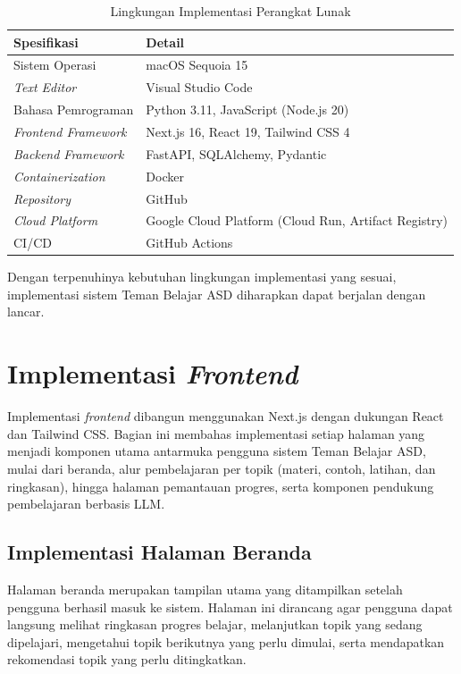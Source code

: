 \begin{table}[H]
    \centering
    \caption{Lingkungan Implementasi Perangkat Lunak}
    \label{tab:impl-software}
    \begin{tabular}{|L{4.5cm}|L{8cm}|}
    \hline
    \textbf{Spesifikasi} & \textbf{Detail} \\
    \hline
    Sistem Operasi & macOS Sequoia 15 \\
    \hline
    \textit{Text Editor} & Visual Studio Code \\
    \hline
    Bahasa Pemrograman & Python 3.11, JavaScript (Node.js 20) \\
    \hline
    \textit{Frontend Framework} & Next.js 16, React 19, Tailwind CSS 4 \\
    \hline
    \textit{Backend Framework} & FastAPI, SQLAlchemy, Pydantic \\
    \hline
    \textit{Containerization} & Docker \\
    \hline
    \textit{Repository} & GitHub \\
    \hline
    \textit{Cloud Platform} & Google Cloud Platform (Cloud Run, Artifact Registry) \\
    \hline
    CI/CD & GitHub Actions \\
    \hline
    \end{tabular}
\end{table}

Dengan terpenuhinya kebutuhan lingkungan implementasi yang sesuai, implementasi sistem Teman Belajar ASD diharapkan dapat berjalan dengan lancar.

\section{Implementasi \textit{Frontend}}

Implementasi \textit{frontend} dibangun menggunakan Next.js dengan dukungan React dan Tailwind CSS. Bagian ini membahas implementasi setiap halaman yang menjadi komponen utama antarmuka pengguna sistem Teman Belajar ASD, mulai dari beranda, alur pembelajaran per topik (materi, contoh, latihan, dan ringkasan), hingga halaman pemantauan progres, serta komponen pendukung pembelajaran berbasis LLM.

\subsection{Implementasi Halaman Beranda}

Halaman beranda merupakan tampilan utama yang ditampilkan setelah pengguna berhasil masuk ke sistem. Halaman ini dirancang agar pengguna dapat langsung melihat ringkasan progres belajar, melanjutkan topik yang sedang dipelajari, mengetahui topik berikutnya yang perlu dimulai, serta mendapatkan rekomendasi topik yang perlu ditingkatkan.

